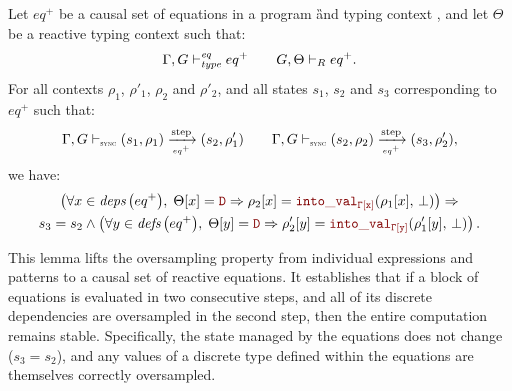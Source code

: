 \begin{lemma}
    \label{lem:semantics:grsync:theorems:oversampling:eq}
    Let $eq^+$ be a causal set of equations in a program \G and typing context \tyCtx, and let
    $\Theta$ be a reactive typing context such that:
    \begin{equation*}
        \Gamma, G \vdash_{\textit{type}}^{\textit{eq}} eq^+ \qquad G, \Theta \vdash_R eq^+.
    \end{equation*}
    For all contexts $\rho_1$, $\rho'_1$, $\rho_2$ and $\rho'_2$, and all states $s_1$, $s_2$ and
    $s_3$ corresponding to $eq^+$ such that:
    \begin{equation*}
        \eqOpsem{\rho_1}{s_1}{eq^+}{s_2}{\rho'_1} \qquad
        \eqOpsem{\rho_2}{s_2}{eq^+}{s_3}{\rho'_2},
    \end{equation*}
    we have:
    \begin{multline*}
        \left(\forall x \in \deps{eq^+}, \; \Theta[x] = \dType \Rightarrow \rho_2[x] = \intoVal{\tyCtx[x]}{\rho_1[x]}{\bot}\right) \Rightarrow \\
        s_3 = s_2 \wedge \left(\forall y \in \defs{eq^+}, \; \Theta[y] = \dType \Rightarrow \rho'_2[y] = \intoVal{\tyCtx[y]}{\rho'_1[y]}{\bot}\right).
    \end{multline*}

    This lemma lifts the oversampling property from individual expressions and patterns to a
    causal set of reactive equations. It establishes that if a block of equations is
    evaluated in two consecutive steps, and all of its discrete dependencies are oversampled
    in the second step, then the entire computation remains stable. Specifically, the state
    managed by the equations does not change ($s_3 = s_2$), and any values of a discrete
    type defined within the equations are themselves correctly oversampled.
\end{lemma}
